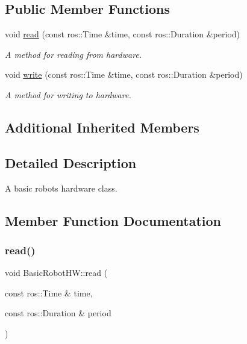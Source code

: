 \subsection*{Public Member Functions}
\begin{DoxyCompactItemize}
\item 
void \hyperlink{classBasicRobotHW_a65df70e5ed1bda01e062977d07429f9a}{read} (const ros\+::\+Time \&time, const ros\+::\+Duration \&period)
\begin{DoxyCompactList}\small\item\em A method for reading from hardware. \end{DoxyCompactList}\item 
void \hyperlink{classBasicRobotHW_ad98c52f214593f8d59b1df93b1155c74}{write} (const ros\+::\+Time \&time, const ros\+::\+Duration \&period)
\begin{DoxyCompactList}\small\item\em A method for writing to hardware. \end{DoxyCompactList}\end{DoxyCompactItemize}
\subsection*{Additional Inherited Members}


\subsection{Detailed Description}
A basic robot\textquotesingle{}s hardware class. 

\subsection{Member Function Documentation}
\mbox{\label{classBasicRobotHW_a65df70e5ed1bda01e062977d07429f9a}} 
\subsubsection{\texorpdfstring{read()}{read()}}
{\footnotesize\ttfamily void Basic\+Robot\+H\+W\+::read (\begin{DoxyParamCaption}\item[{const ros\+::\+Time \&}]{time,  }\item[{const ros\+::\+Duration \&}]{period }\end{DoxyParamCaption})\hspace{0.3cm}{\ttfamily [virtual]}}



